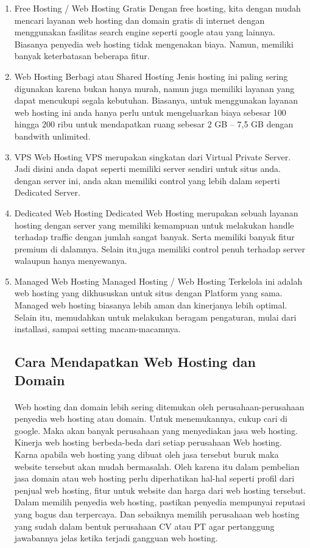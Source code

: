 \documentclass[12pt, a4paper]{article}
\begin{document}
\begin{enumerate}
\item Free Hosting / Web Hosting Gratis
	  Dengan free hosting, kita dengan mudah mencari layanan web hosting dan domain gratis di internet dengan
	  menggunakan fasilitas search engine seperti google atau yang lainnya. Biasanya penyedia web hosting
	  tidak mengenakan biaya. Namun, memiliki banyak keterbatasan beberapa fitur.
\item Web Hosting Berbagi atau Shared Hosting
	  Jenis hosting ini paling sering digunakan karena bukan hanya murah, namun juga memiliki layanan yang
	  dapat mencukupi segala kebutuhan. Biasanya, untuk menggunakan layanan web hosting ini anda hanya perlu
	  untuk mengeluarkan
	  biaya sebesar 100 hingga 200 ribu untuk mendapatkan ruang sebesar 2 GB – 7,5 GB dengan bandwith
	  unlimited.
\item VPS Web Hosting
	  VPS merupakan singkatan dari Virtual Private Server. Jadi disini anda dapat seperti memiliki server
	  sendiri untuk situs anda. dengan server ini, anda akan memiliki control yang lebih dalam seperti
	  Dedicated Server.
\item Dedicated Web Hosting
	  Dedicated Web Hosting merupakan sebuah layanan hosting dengan server yang memiliki kemampuan untuk
	  melakukan handle terhadap traffic dengan jumlah sangat banyak. Serta memiliki banyak fitur premium di
	  dalamnya. Selain itu,juga memiliki control penuh terhadap server walaupun  hanya menyewanya.
\item Managed Web Hosting
	  Managed Hosting / Web Hosting Terkelola ini adalah web hosting yang dikhususkan untuk situs dengan
	  Platform yang sama. Managed web hosting biasanya lebih aman dan kinerjanya lebih optimal. Selain itu,
	  memudahkan untuk melakukan beragam pengaturan, mulai dari installasi, sampai setting macam-macamnya.

\subsection{Cara Mendapatkan Web Hosting dan Domain}
\paragraph{}Web hosting dan domain lebih sering ditemukan oleh perusahaan-perusahaan penyedia web hosting atau domain. Untuk menemukannya, cukup cari di google. Maka akan banyak perusahaan yang menyediakan jasa web hosting. Kinerja web hosting berbeda-beda dari setiap perusahaan Web hosting. Karna apabila web hosting yang dibuat oleh jasa tersebut buruk maka website tersebut akan mudah bermasalah. Oleh karena itu dalam pembelian jasa domain atau web hosting perlu diperhatikan hal-hal seperti profil dari penjual web hosting, fitur untuk website dan harga dari web hosting tersebut. Dalam memilih penyedia web hosting, pastikan penyedia mempunyai reputasi yang bagus dan terpercaya. Dan sebaiknya memilih perusahaan web hosting yang sudah dalam bentuk perusahaan CV atau PT agar pertanggung jawabannya jelas ketika terjadi gangguan web hosting.
	

\end{enumerate}
\end{document}
